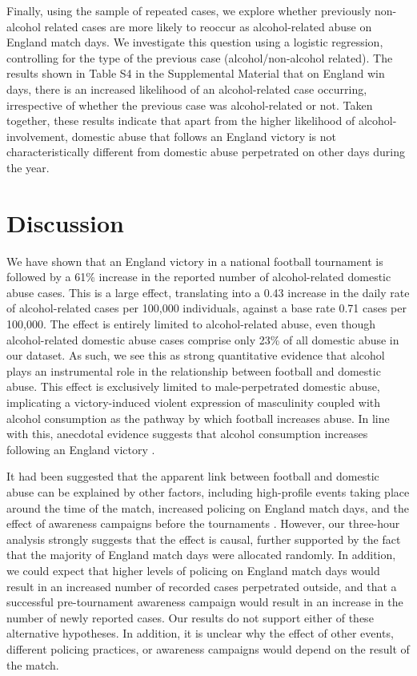 \documentclass[12pt, a4paper]{article}
\begin{document}
Finally, using the sample of repeated cases, we explore whether previously non-alcohol related cases are more likely to reoccur as alcohol-related abuse on England match days. We investigate this question using a logistic regression, controlling for the type of the previous case (alcohol/non-alcohol related). The results shown in Table S4 in the Supplemental Material that on England win days, there is an increased likelihood of an alcohol-related case occurring, irrespective of whether the previous case was alcohol-related or not. Taken together, these results indicate that apart from the higher likelihood of alcohol-involvement, domestic abuse that follows an England victory is not characteristically different from domestic abuse perpetrated on other days during the year.


%
\section*{Discussion}

We have shown that an England victory in a national football tournament is followed by a 61\% increase in the reported number of alcohol-related domestic abuse cases. This is a large effect, translating into a 0.43 increase in the daily rate of alcohol-related cases per 100,000 individuals, against a base rate 0.71 cases per 100,000. The effect is entirely limited to alcohol-related abuse, even though alcohol-related domestic abuse cases comprise only 23\% of all domestic abuse in our dataset. As such, we see this as strong quantitative evidence that alcohol plays an instrumental role in the relationship between football and domestic abuse. This effect is exclusively limited to male-perpetrated domestic abuse, implicating a victory-induced violent expression of masculinity coupled with alcohol consumption as the pathway by which football increases abuse. In line with this, anecdotal evidence suggests that alcohol consumption increases following an England victory \citep{Davies2018}. 

It had been suggested that the apparent link between football and domestic abuse can be explained by other factors, including high-profile events taking place around the time of the match, increased policing on England match days, and the effect of awareness campaigns before the tournaments \citep{Brooks-Hay2018}. However, our three-hour analysis strongly suggests that the effect is causal, further supported by the fact that the majority of England match days were allocated randomly. In addition, we could expect that higher levels of policing on England match days would result in an increased number of recorded cases perpetrated outside, and that a successful pre-tournament awareness campaign would result in an increase in the number of newly reported cases. Our results do not support either of these alternative hypotheses. In addition, it is unclear why the effect of other events, different policing practices, or awareness campaigns would depend on the result of the match. 
\end{document}
